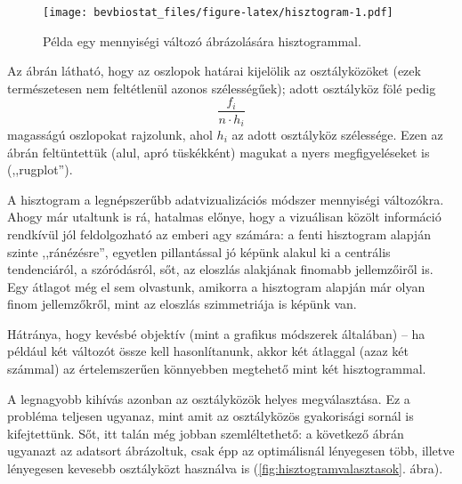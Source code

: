 \documentclass[]{book}
\newenvironment{Shaded}{\begin{snugshade}}{\end{snugshade}}
\newcommand{\KeywordTok}[1]{\textcolor[rgb]{0.13,0.29,0.53}{\textbf{#1}}}
\newcommand{\DataTypeTok}[1]{\textcolor[rgb]{0.13,0.29,0.53}{#1}}
\newcommand{\DecValTok}[1]{\textcolor[rgb]{0.00,0.00,0.81}{#1}}
\newcommand{\StringTok}[1]{\textcolor[rgb]{0.31,0.60,0.02}{#1}}
\newcommand{\OperatorTok}[1]{\textcolor[rgb]{0.81,0.36,0.00}{\textbf{#1}}}
\newcommand{\NormalTok}[1]{#1}
\begin{document}
\begin{figure}
\centering
\texttt{[image: bevbiostat\_files/figure-latex/hisztogram-1.pdf]}
\caption{\label{fig:hisztogram}Példa egy mennyiségi változó ábrázolására
hisztogrammal.}
\end{figure}

Az ábrán látható, hogy az oszlopok határai kijelölik az osztályközöket
(ezek természetesen nem feltétlenül azonos szélességűek); adott
osztályköz fölé pedig \[
    \frac{f_i}{n \cdot h_i}
\] magasságú oszlopokat rajzolunk, ahol \(h_i\) az adott osztályköz
szélessége. Ezen az ábrán feltüntettük (alul, apró tüskékként) magukat a
nyers megfigyeléseket is (,,rugplot'').

A hisztogram a legnépszerűbb adatvizualizációs módszer mennyiségi
változókra. Ahogy már utaltunk is rá, hatalmas előnye, hogy a vizuálisan
közölt információ rendkívül jól feldolgozható az emberi agy számára: a
fenti hisztogram alapján szinte ,,ránézésre'', egyetlen pillantással jó
képünk alakul ki a centrális tendenciáról, a szóródásról, sőt, az
eloszlás alakjának finomabb jellemzőiről is. Egy átlagot még el sem
olvastunk, amikorra a hisztogram alapján már olyan finom jellemzőkről,
mint az eloszlás szimmetriája is képünk van.

Hátránya, hogy kevésbé objektív (mint a grafikus módszerek általában) --
ha például két változót össze kell hasonlítanunk, akkor két átlaggal
(azaz két számmal) az értelemszerűen könnyebben megtehető mint két
hisztogrammal.

A legnagyobb kihívás azonban az osztályközök helyes megválasztása. Ez a
probléma teljesen ugyanaz, mint amit az osztályközös gyakorisági sornál
is kifejtettünk. Sőt, itt talán még jobban szemléltethető: a következő
ábrán ugyanazt az adatsort ábrázoltuk, csak épp az optimálisnál
lényegesen több, illetve lényegesen kevesebb osztályközt használva is
(\ref{fig:hisztogramvalasztasok}. ábra).

\begin{Shaded}
\end{Shaded}
\end{document}
